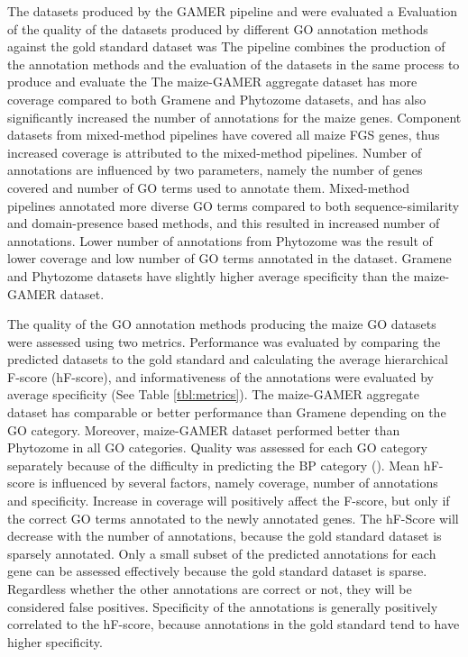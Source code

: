 The datasets produced by the GAMER pipeline and were evaluated a 
Evaluation of the quality of the datasets produced by different GO annotation methods against the gold standard dataset was 
The pipeline combines the production of the annotation methods and the evaluation of the datasets in the same process to produce and evaluate the  
The maize-GAMER aggregate dataset has more coverage compared to both Gramene and Phytozome datasets, and has also significantly increased the number of annotations for the maize genes. Component datasets from mixed-method pipelines have covered all maize FGS genes, thus increased coverage is attributed to the mixed-method pipelines. Number of annotations are influenced by two parameters, namely the number of genes covered and number of GO terms used to annotate them. Mixed-method pipelines annotated more diverse GO terms compared to both sequence-similarity and domain-presence based methods, and this resulted in increased number of annotations. Lower number of annotations from Phytozome was the result of lower coverage and low number of GO terms annotated in the dataset. Gramene and Phytozome datasets have slightly higher average specificity than the maize-GAMER dataset.

The quality of the GO annotation methods producing the maize GO datasets were assessed using two metrics. Performance was evaluated by comparing the predicted datasets to the gold standard and calculating the average hierarchical F-score (hF-score), and informativeness of the annotations were evaluated by average specificity (See Table \ref{tbl:metrics}). The maize-GAMER aggregate dataset has comparable or better performance than Gramene depending on the GO category. Moreover, maize-GAMER dataset performed better than Phytozome in all GO categories. Quality was assessed for each GO category separately because of the difficulty in predicting the BP category (\cite{radivojac_2013-YN}). Mean hF-score is influenced by several factors, namely coverage, number of annotations and specificity. Increase in coverage will positively affect the F-score, but only if the correct GO terms annotated to the newly annotated genes. The hF-Score will decrease with the number of annotations, because the gold standard dataset is sparsely annotated. Only a small subset of the predicted annotations for each gene can be assessed effectively because the gold standard dataset is sparse. Regardless whether the other annotations are correct or not, they will be considered false positives. Specificity of the annotations is generally positively correlated to the hF-score, because annotations in the gold standard tend to have higher specificity. 

